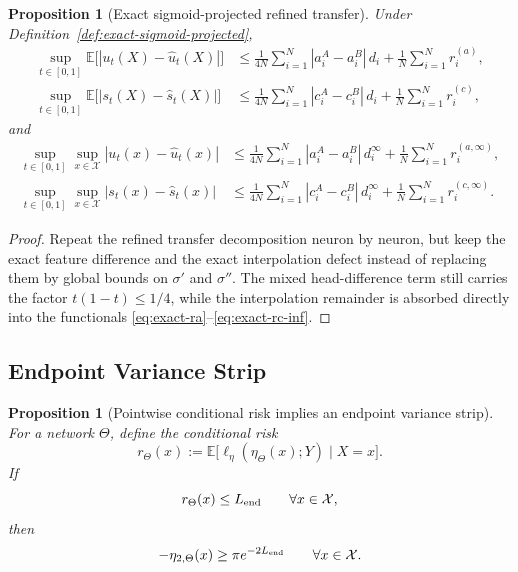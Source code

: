 \documentclass[11pt]{article}
\newtheorem{proposition}[theorem]{Proposition}
\theoremstyle{definition}
\newcommand{\E}{\mathbb{E}}
\newcommand{\abs}[1]{\left\lvert #1 \right\rvert}
\newcommand{\mc}[1]{\mathcal{#1}}
\begin{document}
\begin{proposition}[Exact sigmoid-projected refined transfer]
\label{prop:exact-sigmoid-projected-transfer}
Under Definition~\ref{def:exact-sigmoid-projected},
\begin{align}
  \sup_{t\in[0,1]}\E\big[\abs{u_t(X)-\hat u_t(X)}\big]
  &\le
  \frac{1}{4N}\sum_{i=1}^N \abs{a_i^A-a_i^B}\,d_i
  +
  \frac{1}{N}\sum_{i=1}^N r_i^{(a)},
  \label{eq:exact-transfer-u}
  \\
  \sup_{t\in[0,1]}\E\big[\abs{s_t(X)-\hat s_t(X)}\big]
  &\le
  \frac{1}{4N}\sum_{i=1}^N \abs{c_i^A-c_i^B}\,d_i
  +
  \frac{1}{N}\sum_{i=1}^N r_i^{(c)},
  \label{eq:exact-transfer-s}
\end{align}
and
\begin{align}
  \sup_{t\in[0,1]}\sup_{x\in\mc{X}}\abs{u_t(x)-\hat u_t(x)}
  &\le
  \frac{1}{4N}\sum_{i=1}^N \abs{a_i^A-a_i^B}\,d_i^\infty
  +
  \frac{1}{N}\sum_{i=1}^N r_i^{(a,\infty)},
  \label{eq:exact-transfer-u-inf}
  \\
  \sup_{t\in[0,1]}\sup_{x\in\mc{X}}\abs{s_t(x)-\hat s_t(x)}
  &\le
  \frac{1}{4N}\sum_{i=1}^N \abs{c_i^A-c_i^B}\,d_i^\infty
  +
  \frac{1}{N}\sum_{i=1}^N r_i^{(c,\infty)}.
  \label{eq:exact-transfer-s-inf}
\end{align}
\end{proposition}

\begin{proof}
Repeat the refined transfer decomposition neuron by neuron, but keep the exact
feature difference and the exact interpolation defect instead of replacing them
by global bounds on $\sigma'$ and $\sigma''$. The mixed head-difference term
still carries the factor $t(1-t)\le 1/4$, while the interpolation remainder is
absorbed directly into the functionals
\eqref{eq:exact-ra}--\eqref{eq:exact-rc-inf}.
\end{proof}

\subsection{Endpoint Variance Strip}

\begin{proposition}[Pointwise conditional risk implies an endpoint variance strip]
\label{prop:conditional-risk-strip}
For a network $\Theta$, define the conditional risk
\[
  r_\Theta(x):=\E\big[\ell_\eta(\eta_\Theta(x);Y)\mid X=x\big].
\]
If
\[
  r_\Theta(x)\le L_{\rm end}
  \qquad
  \forall x\in\mc{X},
\]
then
\[
  -\eta_{2,\Theta}(x)\ge \pi e^{-2L_{\rm end}}
  \qquad
  \forall x\in\mc{X}.
\]
\end{proposition}
\end{document}
